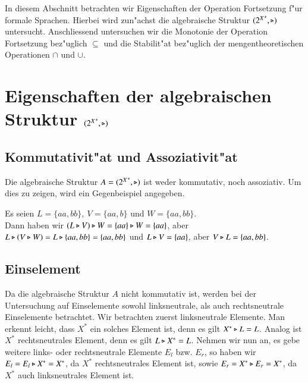 In diesem Abschnitt betrachten wir Eigenschaften der Operation Fortsetzung f"ur formale Sprachen.
Hierbei wird zun"achst die algebraische Struktur $({2^X}^*,\triangleright)$ untersucht. Anschliessend untersuchen wir die Monotonie der Operation Fortsetzung bez"uglich $\subseteq$ und die Stabilit"at bez"uglich der mengentheoretischen Operationen $\cap$ und $\cup$.

\section{Eigenschaften der algebraischen Struktur $({2^X}^*,\triangleright)$}

\subsection{Kommutativit"at und Assoziativit"at}
Die algebraische Struktur $A=({2^X}^*,\triangleright)$ ist weder kommutativ, noch assoziativ. Um dies zu zeigen, wird ein Gegenbeispiel angegeben.

\vspace{2ex}

\begin{beispiel}
Es seien $L=\{aa,bb\},\ V = \{aa,b\}$ und $W=\{aa,bb\}$. \\Dann haben wir $(L\triangleright V)\triangleright W = \{aa\} \triangleright W = \{aa\}$, aber $L\triangleright (V\triangleright W) = L\triangleright \{aa,bb\} = \{aa,bb\}$ und $L\triangleright V = \{aa\}$, aber $V\triangleright L=\{aa,bb\}$.
\end{beispiel}

\subsection{Einselement}

Da die algebraische Struktur $A$ nicht kommutativ ist, werden bei der Untersuchung auf Einselemente sowohl linksneutrale, als auch rechtsneutrale Einselemente betrachtet.
Wir betrachten zuerst linksneutrale Elemente.
Man erkennt leicht, dass $X^*$ ein solches Element ist, denn es gilt $X^*\triangleright L = L$.
Analog ist $X^*$ rechtsneutrales Element, denn es gilt $L\triangleright X^* = L$.
Nehmen wir nun an, es gebe weitere links- oder rechtsneutrale Elemente $E_l$ bzw. $E_r$, so haben wir $E_l=E_l\triangleright X^* = X^*$, da $X^*$ rechtsneutrales Element ist, sowie $E_r = X^*\triangleright E_r = X^*$, da $X^*$ auch linksneutrales Element ist.
